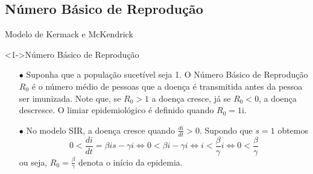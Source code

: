 \documentclass{beamer}
\begin{document}
\subsection{Número Básico de Reprodução}
\begin{frame}{Modelo de Kermack e McKendrick}


    \begin{exampleblock}
        <1->{Número Básico de Reprodução}

        \begin{itemize}
            \item [$\bullet$] Suponha que a população sucetível seja 1. O Número Básico de Reprodução 
                $R_0$ é o número médio de pessoas que a doença é transmitida antes da pessoa ser 
                imunizada. Note que, se $R_0>1$ a doença cresce, já se $R_0<0$, a doença descresce. 
                O limiar epidemiológico é definido quando $R_0 = 1$i.
            \item [$\bullet$] No modelo SIR, a doença cresce quando $\frac{di}{dt} > 0$. Supondo que 
                $s=1$ obtemos
                \[
                 0 < \frac{di}{dt} = \beta i s - \gamma i \iff 
                 0 < \beta i - \gamma i \iff 
                 i < \frac{\beta}{\gamma}i \iff 
                 0 < \frac{\beta}{\gamma}
                \]
                ou seja, $R_0 = \frac{\beta}{\gamma}$ denota o início da epidemia.
        \end{itemize}

    \end{exampleblock} 
    
\end{frame}

\end{document}
